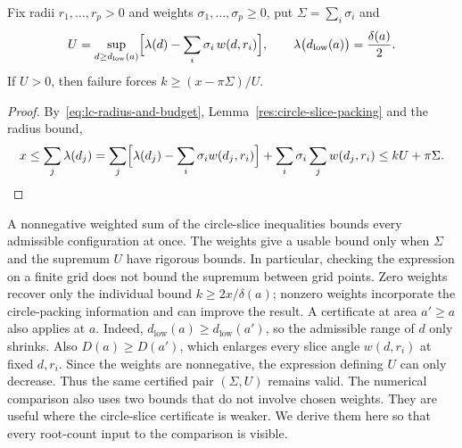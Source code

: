 \begin{remark}\label{res:dual-arity-floor}
Fix radii $r_1,\ldots,r_p>0$ and weights $\sigma_1,\ldots,\sigma_p\ge0$, put
$\Sigma=\sum_i\sigma_i$ and
\[
 U=\sup_{d\ge d_{\mathrm{low}}(a)}
   \Bigl[\lambda(d)-\sum_i\sigma_i\,w(d,r_i)\Bigr],
 \qquad
 \lambda\bigl(d_{\mathrm{low}}(a)\bigr)=\frac{\delta(a)}2 .
\]
If $U>0$, then failure forces $k\ge(x-\pi\Sigma)/U$.
\end{remark}


\begin{proof}
By~\eqref{eq:lc-radius-and-budget}, Lemma~\ref{res:circle-slice-packing} and
the radius bound,
\[
 x\le\sum_j\lambda(d_j)
  =\sum_j\Bigl[\lambda(d_j)-\sum_i\sigma_i w(d_j,r_i)\Bigr]
    +\sum_i\sigma_i\sum_j w(d_j,r_i)
  \le kU+\pi\Sigma. \qedhere
\]
\end{proof}

A nonnegative weighted sum of the circle-slice inequalities bounds every
admissible configuration at once. The weights give a
usable bound only when
$\Sigma$ and the supremum $U$ have rigorous bounds. In particular, checking
the expression on a finite grid does not bound the supremum between grid
points. Zero weights recover only the individual bound
$k\ge2x/\delta(a)$; nonzero weights incorporate the circle-packing
information and can improve the result.
A certificate at area $a'\ge a$ also applies at $a$. Indeed,
$d_{\mathrm{low}}(a)\ge d_{\mathrm{low}}(a')$, so the admissible range of
$d$ only shrinks. Also $D(a)\ge D(a')$, which enlarges every slice angle
$w(d,r_i)$ at fixed $d,r_i$. Since the weights are nonnegative, the
expression defining $U$ can only decrease. Thus the same certified pair
$(\Sigma,U)$ remains valid.
The numerical comparison also uses two bounds that do not involve chosen
weights. They are useful where the circle-slice certificate is weaker.
We derive them here so that every root-count input to the comparison is
visible.

